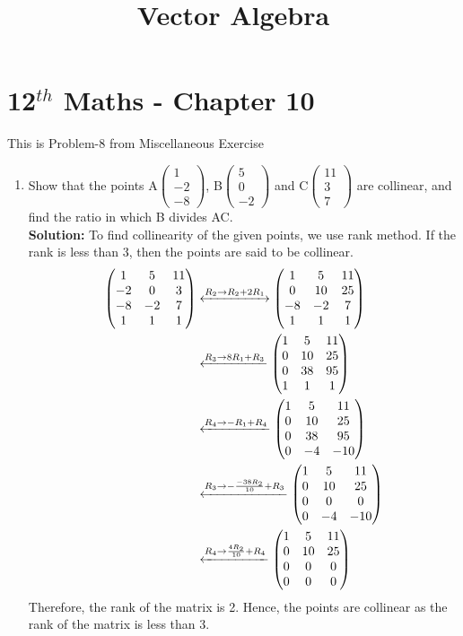 \documentclass[12pt]{article}
\newcommand{\solution}{\noindent \textbf{Solution: }}
\newcommand{\myvec}[1]{\ensuremath{\begin{pmatrix}#1\end{pmatrix}}}
\begin{document}
\begin{center}
\title{\textbf{Vector Algebra}}
\date{\vspace{-5ex}} %
\maketitle
\end{center}
\setcounter{page}{1}

\section{12$^{th}$ Maths - Chapter 10}
This is Problem-8 from Miscellaneous Exercise
\begin{enumerate}
\item Show that the points A$\myvec{1\\-2\\-8}$, B$\myvec{5\\0\\-2}$ and C$\myvec{11\\3\\7}$ are collinear, and
find the ratio in which B divides AC.\\
\solution 
To find collinearity of the given points, we use rank method. If the rank is less than 3, then the points are said to be collinear.
\begin{align}
 \myvec{1&5&11\\-2&0&3\\-8&-2&7\\1&1&1} &\xleftrightarrow[]{R_2\rightarrow R_2+2R_1} \myvec{1&5&11\\0&10&25\\-8&-2&7\\1&1&1}\\
 \label{eq:1}
 &\xleftarrow[]{R_3\rightarrow 8R_1 + R_3} \myvec{1&5&11\\0&10&25\\0&38&95\\1&1&1}\\
 \label{eq:2}
 &\xleftarrow[]{R_4\rightarrow -R_1 + R_4} \myvec{1&5&11\\0&10&25\\0&38&95\\0&-4&-10}\\
 \label{eq:3}
 &\xleftarrow[]{R_3\rightarrow -\frac{-38R_2}{10} + R_3} \myvec{1&5&11\\0&10&25\\0&0&0\\0&-4&-10}\\
 \label{eq:4}
 &\xleftarrow[]{R_4\rightarrow \frac{4R_2}{10} + R_4} \myvec{1&5&11\\0&10&25\\0&0&0\\0&0&0}
 \label{eq:5}
\end{align}
Therefore, the rank of the matrix is 2. Hence, the points are collinear as the rank of the matrix is less than 3.\\ \\


\end{enumerate}
\end{document}

